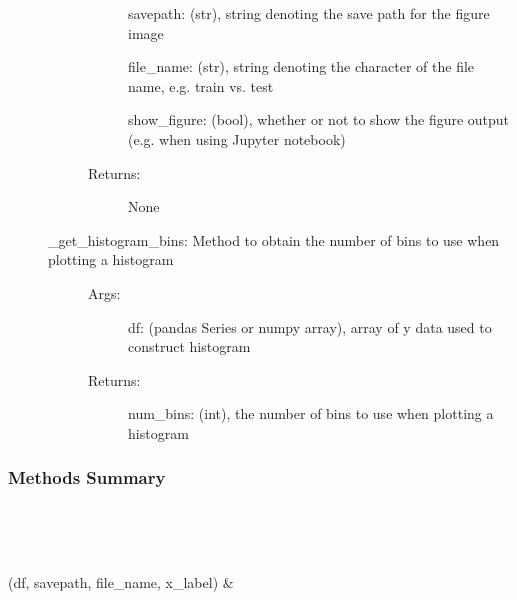 \documentclass[letterpaper,10pt,english]{sphinxmanual}
\begin{document}
\begin{fulllineitems}
\begin{description}
\begin{description}
\begin{description}
savepath: (str), string denoting the save path for the figure image

file\_name: (str), string denoting the character of the file name, e.g. train vs. test

show\_figure: (bool), whether or not to show the figure output (e.g. when using Jupyter notebook)

\item[{Returns:}] \leavevmode
None

\end{description}

\item[{\_get\_histogram\_bins: Method to obtain the number of bins to use when plotting a histogram}] \leavevmode\begin{description}
\item[{Args:}] \leavevmode
df: (pandas Series or numpy array), array of y data used to construct histogram

\item[{Returns:}] \leavevmode
num\_bins: (int), the number of bins to use when plotting a histogram

\end{description}

\end{description}

\end{description}
\subsubsection*{Methods Summary}


\begin{savenotes}\sphinxatlongtablestart\begin{longtable}[c]{}
\hline

\endfirsthead

%
{}\\
\hline

\endhead

\hline
{}\\
\endfoot

\endlastfoot

{\hyperref[\detokenize{api/mastml.plots.Histogram:mastml.plots.Histogram.plot_histogram}]{}}(df, savepath, file\_name, x\_label)
&


\end{longtable}
\end{savenotes}
\end{fulllineitems}
\end{document}
